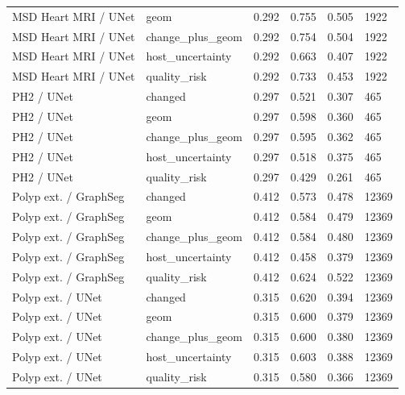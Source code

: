 \begin{table}[t]
\begin{tabular}{llllll}
MSD Heart MRI / UNet & geom & 0.292 & 0.755 & 0.505 & 1922 \\
MSD Heart MRI / UNet & change\_plus\_geom & 0.292 & 0.754 & 0.504 & 1922 \\
MSD Heart MRI / UNet & host\_uncertainty & 0.292 & 0.663 & 0.407 & 1922 \\
MSD Heart MRI / UNet & quality\_risk & 0.292 & 0.733 & 0.453 & 1922 \\
PH2 / UNet & changed & 0.297 & 0.521 & 0.307 & 465 \\
PH2 / UNet & geom & 0.297 & 0.598 & 0.360 & 465 \\
PH2 / UNet & change\_plus\_geom & 0.297 & 0.595 & 0.362 & 465 \\
PH2 / UNet & host\_uncertainty & 0.297 & 0.518 & 0.375 & 465 \\
PH2 / UNet & quality\_risk & 0.297 & 0.429 & 0.261 & 465 \\
Polyp ext. / GraphSeg & changed & 0.412 & 0.573 & 0.478 & 12369 \\
Polyp ext. / GraphSeg & geom & 0.412 & 0.584 & 0.479 & 12369 \\
Polyp ext. / GraphSeg & change\_plus\_geom & 0.412 & 0.584 & 0.480 & 12369 \\
Polyp ext. / GraphSeg & host\_uncertainty & 0.412 & 0.458 & 0.379 & 12369 \\
Polyp ext. / GraphSeg & quality\_risk & 0.412 & 0.624 & 0.522 & 12369 \\
Polyp ext. / UNet & changed & 0.315 & 0.620 & 0.394 & 12369 \\
Polyp ext. / UNet & geom & 0.315 & 0.600 & 0.379 & 12369 \\
Polyp ext. / UNet & change\_plus\_geom & 0.315 & 0.600 & 0.380 & 12369 \\
Polyp ext. / UNet & host\_uncertainty & 0.315 & 0.603 & 0.388 & 12369 \\
Polyp ext. / UNet & quality\_risk & 0.315 & 0.580 & 0.366 & 12369 \\
\bottomrule
\end{tabular}
\end{table}
